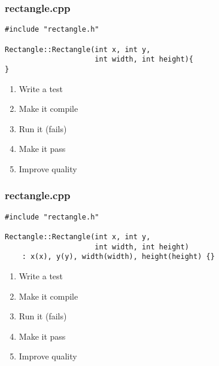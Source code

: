 \begin{frame}[fragile]
\frametitle{rectangle.cpp}
\begin{minipage}[t]{0.48\linewidth}
\begin{lstlisting}
#include "rectangle.h"

Rectangle::Rectangle(int x, int y, 
                     int width, int height){
}
\end{lstlisting}
\end{minipage}\hfill
\begin{minipage}[t]{0.28\linewidth}
  \small
  \begin{enumerate} 
    \item \textcolor{deadcolor}{Write a test}
    \item \textcolor{deadcolor}{Make it compile}
    \item \textcolor{deadcolor}{Run it (fails)}
    \item \textcolor{activecolor}{Make it pass}
    \item \textcolor{deadcolor}{Improve quality}
  \end{enumerate} 
\end{minipage}
\end{frame}

\begin{frame}[fragile]
\frametitle{rectangle.cpp}
\begin{minipage}[t]{0.48\linewidth}
\begin{lstlisting}
#include "rectangle.h"

Rectangle::Rectangle(int x, int y, 
                     int width, int height)
    : x(x), y(y), width(width), height(height) {}

\end{lstlisting}
\end{minipage}\hfill
\begin{minipage}[t]{0.28\linewidth}
  \small
  \begin{enumerate} 
    \item \textcolor{deadcolor}{Write a test}
    \item \textcolor{deadcolor}{Make it compile}
    \item \textcolor{deadcolor}{Run it (fails)}
    \item \textcolor{activecolor}{Make it pass}
    \item \textcolor{deadcolor}{Improve quality}
  \end{enumerate} 
\end{minipage}
\end{frame}

